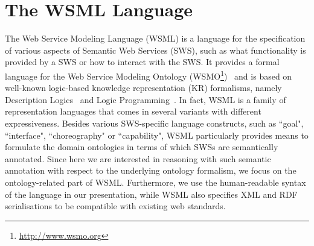 \newcommand{\concept}[1]{\wsmlname{#1}}
\newcommand{\attribute}[1]{\wsmlname{#1}}
\newcommand{\instance}[1]{\wsmlname{#1}}

\section{The WSML Language}\label{sec:wsml}
The Web Service Modeling Language (WSML) \cite{wsml} is a language
for the specification of various aspects of Semantic Web Services
(SWS), such as what functionality is provided by a SWS or how to
interact with the SWS. It provides a formal language for the Web
Service Modeling Ontology
(WSMO\footnote{\url{http://www.wsmo.org}})~\cite{roman05:_web_servic_model_ontol}
and is based on well-known logic-based knowledge representation
(KR) formalisms, namely Description
Logics~\cite{Baader+CalvaneseETAL-DescLogiHand:03} and Logic
Programming~\cite{lloyd-FoundationsOfLP}. In fact, WSML is a
family of representation languages that comes in several variants
with different expressiveness. Besides various SWS-specific
language constructs, such as ``goal", ``interface",
``choreography" or ``capability", WSML particularly provides means
to formulate the domain ontologies in terms of which SWSs are
semantically annotated. Since here we are interested in reasoning
with such semantic annotation with respect to the underlying
ontology formalism, we focus on the ontology-related part of WSML.
Furthermore, we use the human-readable syntax of the language in
our presentation, while WSML also specifies XML and RDF
serialisations to be compatible with existing web standards.

